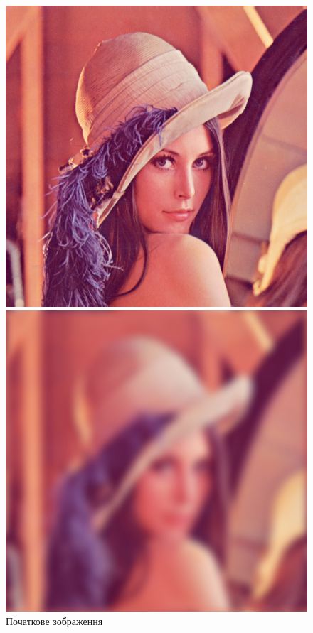 \documentclass{diploma}
\begin{document}
      \begin{figure}[htb]
          \includegraphics[width=\linewidth]{Lenna.png}
          \caption{Початкове зображення}\label{fig:Lenna-img}
        \endminipage\hfill
          \includegraphics[width=\linewidth]{Lenna-blurred.png}

\end{figure}
\end{document}
